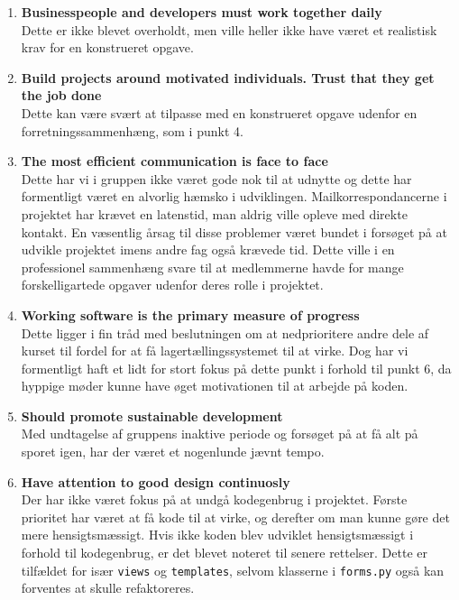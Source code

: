 \documentclass[]{article}
\begin{document}
\begin{enumerate}
    \item \textbf{Businesspeople and developers must work together daily} \\
Dette er ikke blevet overholdt, men ville heller ikke have været et realistisk krav for en konstrueret opgave. 

    \item \textbf{Build projects around motivated individuals. Trust that they get the job done} \\
Dette kan være svært at tilpasse med en konstrueret opgave udenfor en forretningssammenhæng, som i punkt 4.
 
    \item \textbf{The most efficient communication is face to face} \\
Dette har vi i gruppen ikke været gode nok til at udnytte og dette har formentligt været en alvorlig hæmsko i udviklingen. Mailkorrespondancerne i projektet har krævet en latenstid, man aldrig ville opleve med direkte kontakt. 
En væsentlig årsag til disse problemer været bundet i forsøget på at udvikle projektet imens andre fag også krævede tid. Dette ville i en professionel sammenhæng svare til at medlemmerne havde for mange forskelligartede opgaver udenfor deres rolle i projektet.

    \item \textbf{Working software is the primary measure of progress} \\
Dette ligger i fin tråd med beslutningen om at nedprioritere andre dele af kurset til fordel for at få lagertællingssystemet til at virke. Dog har vi formentligt haft et lidt for stort fokus på dette punkt i forhold til punkt 6, da hyppige møder kunne have øget motivationen til at arbejde på koden.

    \item \textbf{Should promote sustainable development} \\
Med undtagelse af gruppens inaktive periode og forsøget på at få alt på sporet igen, har der været et nogenlunde jævnt tempo.

    \item \textbf{Have attention to good design continuosly} \\
Der har ikke været fokus på at undgå kodegenbrug i projektet. Første prioritet har været at få kode til at virke, og derefter om man kunne gøre det mere hensigtsmæssigt. Hvis ikke koden blev udviklet hensigtsmæssigt i forhold til kodegenbrug, er det blevet noteret til senere rettelser. Dette er tilfældet for især \texttt{views} og \texttt{templates}, selvom klasserne i \texttt{forms.py} også kan forventes at skulle refaktoreres.


\end{enumerate}
\end{document}
